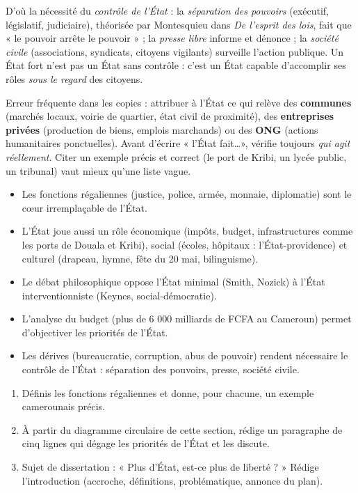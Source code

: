 \documentclass[11pt]{article}
\newcommand{\cle}[1]{{\popxbold\color{popdark}#1}}
\begin{document}
D'où la nécessité du \emph{contrôle de l'État} : la \emph{séparation des pouvoirs} (exécutif, législatif, judiciaire), théorisée par Montesquieu dans \emph{De l'esprit des lois}, fait que « le pouvoir arrête le pouvoir » ; la \emph{presse libre} informe et dénonce ; la \emph{société civile} (associations, syndicats, citoyens vigilants) surveille l'action publique. Un État fort n'est pas un État sans contrôle : c'est un État capable d'accomplir ses rôles \emph{sous le regard} des citoyens.

\begin{attention}
Erreur fréquente dans les copies : attribuer à l'État ce qui relève des \textbf{communes} (marchés locaux, voirie de quartier, état civil de proximité), des \textbf{entreprises privées} (production de biens, emplois marchands) ou des \textbf{ONG} (actions humanitaires ponctuelles). Avant d'écrire « l'État fait\dots », vérifie toujours \emph{qui agit réellement}. Citer un exemple précis et correct (le port de Kribi, un lycée public, un tribunal) vaut mieux qu'une liste vague.
\end{attention}

\begin{aretenir}
\begin{itemize}
\item Les \cle{fonctions régaliennes} (justice, police, armée, monnaie, diplomatie) sont le cœur irremplaçable de l'État.
\item L'État joue aussi un rôle \cle{économique} (impôts, budget, infrastructures comme les ports de Douala et Kribi), \cle{social} (écoles, hôpitaux : l'État-providence) et \cle{culturel} (drapeau, hymne, fête du 20 mai, bilinguisme).
\item Le débat philosophique oppose l'\cle{État minimal} (Smith, Nozick) à l'\cle{État interventionniste} (Keynes, social-démocratie).
\item L'analyse du budget (plus de 6 000 milliards de FCFA au Cameroun) permet d'objectiver les priorités de l'État.
\item Les dérives (bureaucratie, corruption, abus de pouvoir) rendent nécessaire le \cle{contrôle} de l'État : séparation des pouvoirs, presse, société civile.
\end{itemize}
\end{aretenir}

\begin{exercice}
\begin{enumerate}
\item Définis les fonctions régaliennes et donne, pour chacune, un exemple camerounais précis.
\item À partir du diagramme circulaire de cette section, rédige un paragraphe de cinq lignes qui dégage les priorités de l'État et les discute.
\item Sujet de dissertation : « Plus d'État, est-ce plus de liberté ? » Rédige l'introduction (accroche, définitions, problématique, annonce du plan).
\end{enumerate}
\end{exercice}
\end{document}
